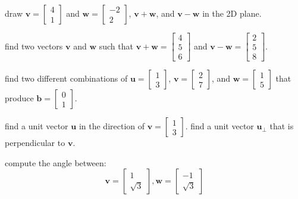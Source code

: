 \documentclass[addpoints]{exam}
\begin{document}
\begin{questions}
	\question draw 
	$\mathbf{v} = \begin{bmatrix} 4 \\ 1 \end{bmatrix}$ and $\mathbf{w} = \begin{bmatrix} -2 \\ 2 \end{bmatrix}$, $\mathbf{v}+\mathbf{w}$, and $\mathbf{v}-\mathbf{w}$ in the 2D plane.
	
	\question find two vectors $\mathbf{v}$ and $\mathbf{w}$ such that $\mathbf{v}+\mathbf{w}=\begin{bmatrix}  4 \\ 5 \\6 \end{bmatrix}$ and $\mathbf{v}-\mathbf{w}=\begin{bmatrix}  2 \\ 5 \\8 \end{bmatrix}$.
	
	\question find two different combinations of $\mathbf{u}=\begin{bmatrix}  1\\3 \end{bmatrix}$, $\mathbf{v}=\begin{bmatrix}  2\\7 \end{bmatrix}$, and $\mathbf{w}=\begin{bmatrix}  1\\5 \end{bmatrix}$ that produce  $\mathbf{b}=\begin{bmatrix}  0\\1\end{bmatrix}$.
	
	\question find a unit vector $\mathbf{u}$ in the direction of $\mathbf{v}= \begin{bmatrix} 1 \\ 3 \end{bmatrix}$. find a unit vector $\mathbf{u}_\perp$ that is perpendicular to $\mathbf{v}$.
	
	\question compute the angle between:
	\begin{equation*}
		\mathbf{v} = \begin{bmatrix} 1 \\ \sqrt{3} \end{bmatrix}, \mathbf{w} = \begin{bmatrix} -1 \\ \sqrt{3} \end{bmatrix}
	\end{equation*}
	

\end{questions}
\end{document}
